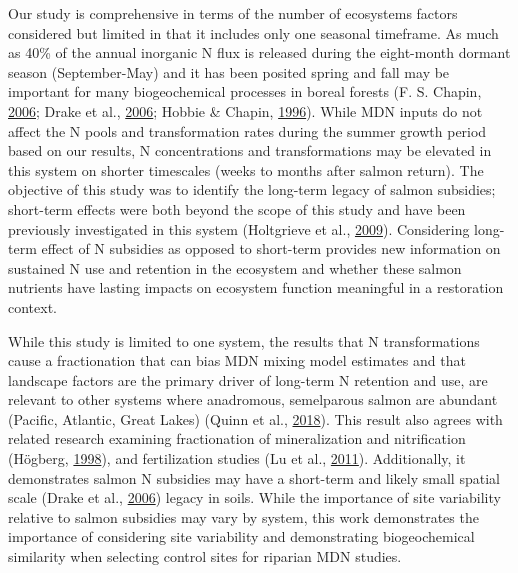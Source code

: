 \documentclass [11pt, proquest] {uwthesis}[2015/03/03]
\begin{document}
Our study is comprehensive in terms of the number of ecosystems factors
considered but limited in that it includes only one seasonal timeframe.
As much as 40\% of the annual inorganic N flux is released during the
eight-month dormant season (September-May) and it has been posited
spring and fall may be important for many biogeochemical processes in
boreal forests (F. S. Chapin, \protect\hyperlink{ref-Chapin2006}{2006};
Drake et al., \protect\hyperlink{ref-Drake2006}{2006}; Hobbie \& Chapin,
\protect\hyperlink{ref-Hobbie1996}{1996}). While MDN inputs do not
affect the N pools and transformation rates during the summer growth
period based on our results, N concentrations and transformations may be
elevated in this system on shorter timescales (weeks to months after
salmon return). The objective of this study was to identify the
long-term legacy of salmon subsidies; short-term effects were both
beyond the scope of this study and have been previously investigated in
this system (Holtgrieve et al.,
\protect\hyperlink{ref-Holtgrieve2009}{2009}). Considering long-term
effect of N subsidies as opposed to short-term provides new information
on sustained N use and retention in the ecosystem and whether these
salmon nutrients have lasting impacts on ecosystem function meaningful
in a restoration context.

While this study is limited to one system, the results that N
transformations cause a fractionation that can bias MDN mixing model
estimates and that landscape factors are the primary driver of long-term
N retention and use, are relevant to other systems where anadromous,
semelparous salmon are abundant (Pacific, Atlantic, Great Lakes) (Quinn
et al., \protect\hyperlink{ref-Quinn2018}{2018}). This result also
agrees with related research examining fractionation of mineralization
and nitrification (Högberg, \protect\hyperlink{ref-Hogberg1998}{1998}),
and fertilization studies (Lu et al.,
\protect\hyperlink{ref-Lu2011}{2011}). Additionally, it demonstrates
salmon N subsidies may have a short-term and likely small spatial scale
(Drake et al., \protect\hyperlink{ref-Drake2006}{2006}) legacy in soils.
While the importance of site variability relative to salmon subsidies
may vary by system, this work demonstrates the importance of considering
site variability and demonstrating biogeochemical similarity when
selecting control sites for riparian MDN studies.
\end{document}
